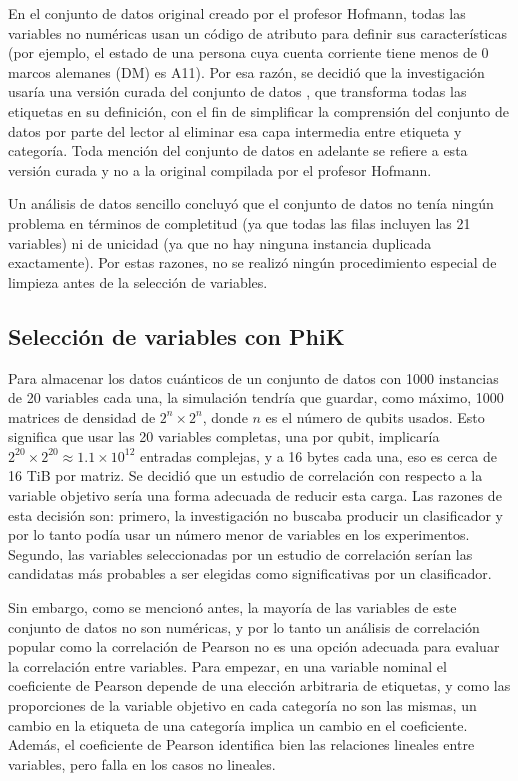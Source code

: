 \documentclass{ieeeaccess}
\begin{document}
En el conjunto de datos original creado por el profesor Hofmann, todas las variables no numéricas usan un código de atributo para definir sus características (por ejemplo, el estado de una persona cuya cuenta corriente tiene menos de 0 marcos alemanes (DM) es A11). Por esa razón, se decidió que la investigación usaría una versión curada del conjunto de datos \cite{germancredit2026}, que transforma todas las etiquetas en su definición, con el fin de simplificar la comprensión del conjunto de datos por parte del lector al eliminar esa capa intermedia entre etiqueta y categoría. Toda mención del conjunto de datos en adelante se refiere a esta versión curada y no a la original compilada por el profesor Hofmann.

Un análisis de datos sencillo concluyó que el conjunto de datos no tenía ningún problema en términos de completitud (ya que todas las filas incluyen las 21 variables) ni de unicidad (ya que no hay ninguna instancia duplicada exactamente). Por estas razones, no se realizó ningún procedimiento especial de limpieza antes de la selección de variables.

\subsection{Selección de variables con PhiK}
\label{subsec:var_selection}

Para almacenar los datos cuánticos de un conjunto de datos con 1000 instancias de 20 variables cada una, la simulación tendría que guardar, como máximo, 1000 matrices de densidad de $2^n \times 2^n$, donde $n$ es el número de qubits usados. Esto significa que usar las 20 variables completas, una por qubit, implicaría $2^{20} \times 2^{20} \approx 1.1 \times 10^{12}$ entradas complejas, y a 16 bytes cada una, eso es cerca de 16 TiB por matriz. Se decidió que un estudio de correlación con respecto a la variable objetivo sería una forma adecuada de reducir esta carga. Las razones de esta decisión son: primero, la investigación no buscaba producir un clasificador y por lo tanto podía usar un número menor de variables en los experimentos. Segundo, las variables seleccionadas por un estudio de correlación serían las candidatas más probables a ser elegidas como significativas por un clasificador.

Sin embargo, como se mencionó antes, la mayoría de las variables de este conjunto de datos no son numéricas, y por lo tanto un análisis de correlación popular como la correlación de Pearson no es una opción adecuada para evaluar la correlación entre variables. Para empezar, en una variable nominal el coeficiente de Pearson depende de una elección arbitraria de etiquetas, y como las proporciones de la variable objetivo en cada categoría no son las mismas, un cambio en la etiqueta de una categoría implica un cambio en el coeficiente. Además, el coeficiente de Pearson identifica bien las relaciones lineales entre variables, pero falla en los casos no lineales.
\end{document}
